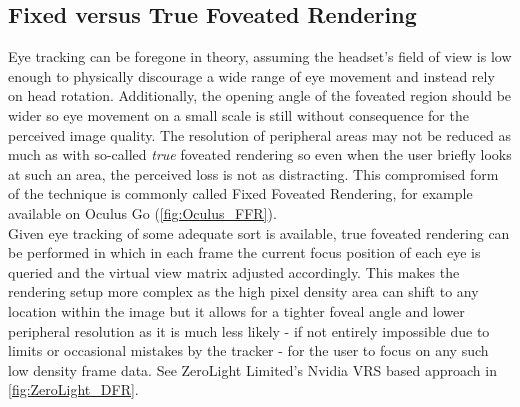 \subsection{Fixed versus True Foveated Rendering}
Eye tracking can be foregone in theory, assuming the headset's field of view is low enough to physically discourage a wide range of eye movement and instead rely on head rotation. Additionally, the opening angle of the foveated region should be wider so eye movement on a small scale is still without consequence for the perceived image quality. The resolution of peripheral areas may not be reduced as much as with so-called \textit{true} foveated rendering so even when the user briefly looks at such an area, the perceived loss is not as distracting. This compromised form of the technique is commonly called Fixed Foveated Rendering, for example available on Oculus Go (\autoref{fig:Oculus_FFR}). \\
Given eye tracking of some adequate sort is available, true foveated rendering can be performed in which in each frame the current focus position of each eye is queried and the virtual view matrix adjusted accordingly. This makes the rendering setup more complex as the high pixel density area can shift to any location within the image but it allows for a tighter foveal angle and lower peripheral resolution as it is much less likely - if not entirely impossible due to limits or occasional mistakes by the tracker - for the user to focus on any such low density frame data. See ZeroLight Limited's Nvidia VRS based approach in \autoref{fig:ZeroLight_DFR}. 


